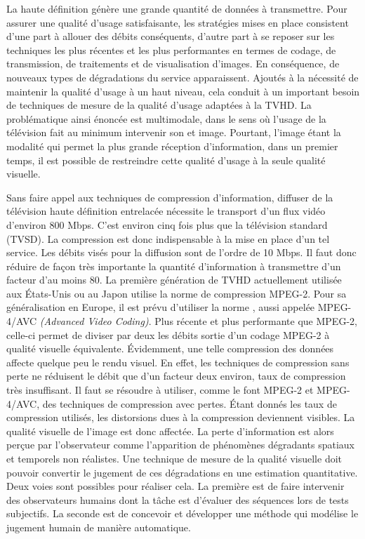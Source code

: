 La haute définition génère une grande quantité de données à transmettre. Pour assurer une qualité d'usage satisfaisante, les stratégies mises en place consistent d'une part à allouer des débits conséquents, d'autre part à se reposer sur les techniques les plus récentes et les plus performantes en termes de codage, de transmission, de traitements et de visualisation d'images. En conséquence, de nouveaux types de dégradations du service apparaissent. Ajoutés à la nécessité de maintenir la qualité d'usage à un haut niveau, cela conduit à un important besoin de techniques de mesure de la qualité d'usage adaptées à la TVHD. La problématique ainsi énoncée est multimodale, dans le sens où l'usage de la télévision fait au minimum intervenir son et image. Pourtant, l'image étant la modalité qui permet la plus grande réception d'information, dans un premier temps, il est possible de restreindre cette qualité d'usage à la seule qualité visuelle.

Sans faire appel aux techniques de compression d'information, diffuser de la télévision haute définition entrelacée nécessite le transport d'un flux vidéo d'environ 800 Mbps. C'est environ cinq fois plus que la télévision standard (TVSD). La compression est donc indispensable à la mise en place d'un tel service. Les débits visés pour la diffusion sont de l'ordre de 10 Mbps. Il faut donc réduire de façon très importante la quantité d'information à transmettre d'un facteur d'au moins 80. La première génération de TVHD actuellement utilisée aux États-Unis ou au Japon utilise la norme de compression MPEG-2. Pour sa généralisation en Europe, il est prévu d'utiliser la norme \avc, aussi appelée MPEG-4/AVC \emph{(Advanced Video Coding)}. Plus récente et plus performante que MPEG-2, celle-ci permet de diviser par deux les débits sortie d'un codage MPEG-2 à qualité visuelle équivalente. Évidemment, une telle compression des données affecte quelque peu le rendu visuel. En effet, les techniques de compression sans perte ne réduisent le débit que d'un facteur deux environ, taux de compression très insuffisant. Il faut se résoudre à utiliser, comme le font MPEG-2 et MPEG-4/AVC, des techniques de compression avec pertes. Étant donnés les taux de compression utilisés, les distorsions dues à la compression deviennent visibles. La qualité visuelle de l'image est donc affectée. La perte d'information est alors perçue par l'observateur comme l'apparition de phénomènes dégradants spatiaux et temporels non réalistes. Une technique de mesure de la qualité visuelle doit pouvoir convertir le jugement de ces dégradations en une estimation quantitative. Deux voies sont possibles pour réaliser cela. La première est de faire intervenir des observateurs humains dont la tâche est d'évaluer des séquences lors de tests subjectifs. La seconde est de concevoir et développer une méthode qui modélise le jugement humain de manière automatique.


